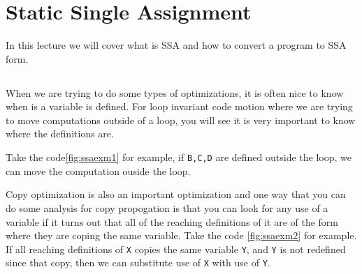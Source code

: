 \section{Static Single Assignment}

In this lecture we will cover what is SSA and how to convert a program to SSA form.

\subsection{}

When we are trying to do some types of optimizations, it is often nice to know when is a variable is defined.
For loop invariant code motion where we are trying to move computations outside of a loop, you will see it is very important to 
know where the definitions are.



Take the code\ref{fig:ssaexm1} for example, if \texttt{B,C,D} are defined outside the loop, we can move the computation ouside the loop.



Copy optimization is also an important optimization and one way that you can do some analysis for copy propogation is that you can 
look for any use of a variable if it turns out that all of the reaching definitions of it are of the form where they are coping the same 
variable. Take the code \ref{fig:ssaexm2} for example. If all reaching definitions of \texttt{X} copies the same variable \texttt{Y}, and \texttt{Y} is not 
redefined since that copy, then we can substitute use of \texttt{X} with use of \texttt{Y}.





